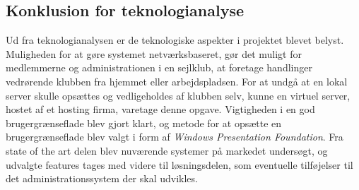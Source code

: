\subsection{Konklusion for teknologianalyse}

Ud fra teknologianalysen er de teknologiske aspekter i projektet blevet belyst. Muligheden for at gøre
systemet netværksbaseret, gør det muligt for medlemmerne og administrationen i en sejlklub, at foretage
handlinger vedrørende klubben fra hjemmet eller arbejdspladsen. For at undgå at en lokal server skulle
opsættes og vedligeholdes af klubben selv, kunne en virtuel server, hostet af et hosting firma, varetage denne
opgave. Vigtigheden i en god brugergrænseflade blev gjort klart, og metode for at opsætte en brugergrænseflade
blev valgt i form af \textit{Windows Presentation Foundation}. Fra state of the art delen blev nuværende systemer på markedet
undersøgt, og udvalgte features tages med videre til løsningsdelen, som eventuelle tilføjelser til det
administrationssystem der skal udvikles.


